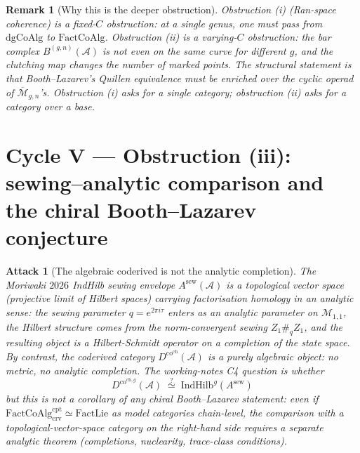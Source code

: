 \documentclass[11pt]{amsart}
\newtheorem{attack}{Attack}
\newtheorem{remark}[theorem]{Remark}
\newcommand{\cA}{\mathcal{A}}
\newcommand{\cM}{\mathcal{M}}
\newcommand{\FactCoAlg}{\mathrm{FactCoAlg}}
\newcommand{\FactLie}{\mathrm{FactLie}}
\newcommand{\crv}{\mathrm{crv}}
\newcommand{\cpt}{\mathrm{cpt}}
\newcommand{\dgCoAlg}{\mathrm{dgCoAlg}}
\newcommand{\Dco}{D^{\mathrm{co}}}
\newcommand{\IndHilb}{\mathrm{IndHilb}}
\newcommand{\Mbar}{\overline{\cM}}
\begin{document}
\begin{remark}[Why this is the deeper obstruction]
Obstruction (i) (Ran-space coherence) is a \emph{fixed-$C$} obstruction:
at a single genus, one must pass from $\dgCoAlg$ to $\FactCoAlg$.
Obstruction (ii) is a \emph{varying-$C$} obstruction: the bar complex
$B^{(g,n)}(\cA)$ is not even on the same curve for different $g$, and
the clutching map changes the number of marked points. The structural
statement is that Booth--Lazarev's Quillen equivalence must be
\emph{enriched} over the cyclic operad of $\Mbar_{g,n}$'s. Obstruction
(i) asks for a single category; obstruction (ii) asks for a category
over a base.
\end{remark}

\section{Cycle V --- Obstruction (iii): sewing--analytic comparison
and the chiral Booth--Lazarev conjecture}
\label{sec:cycle-V}

\begin{attack}[The algebraic coderived is not the analytic completion]
The Moriwaki $2026$ IndHilb sewing envelope $A^{\mathrm{sew}}(\cA)$ is
a \emph{topological vector space} (projective limit of Hilbert
spaces) carrying factorisation homology in an \emph{analytic} sense:
the sewing parameter $q=e^{2\pi i\tau}$ enters as an analytic
parameter on $\cM_{1,1}$, the Hilbert structure comes from the
norm-convergent sewing $Z_1\#_q Z_1$, and the resulting object is
a Hilbert-Schmidt operator on a completion of the state space.
By contrast, the coderived category $\Dco^{\mathrm{ch}}(\cA)$ is a
purely algebraic object: no metric, no analytic completion. The
working-notes C4 question is whether
\begin{equation}
\Dco^{\mathrm{ch},g}(\cA) \;\stackrel{?}{\simeq}\;
\IndHilb^g(A^{\mathrm{sew}})
\label{eq:alg-vs-analytic}
\end{equation}
but this is \emph{not} a corollary of any chiral Booth--Lazarev
statement: even if
$\FactCoAlg^{\cpt}_{\crv}\simeq\FactLie$ as model categories
chain-level, the comparison with a topological-vector-space
category on the right-hand side requires a separate analytic theorem
(completions, nuclearity, trace-class conditions).
\end{attack}
\end{document}

